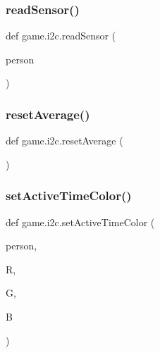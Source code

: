 \hypertarget{namespacegame_1_1i2c_aa4e92c48e15886b974e184f3f010fc1f}{}\label{namespacegame_1_1i2c_aa4e92c48e15886b974e184f3f010fc1f} 
\subsubsection{\texorpdfstring{read\+Sensor()}{readSensor()}}
{\footnotesize\ttfamily def game.\+i2c.\+read\+Sensor (\begin{DoxyParamCaption}\item[{}]{person }\end{DoxyParamCaption})}

\hypertarget{namespacegame_1_1i2c_a7e8169f802337f7cea2d2f1bd574d10b}{}\label{namespacegame_1_1i2c_a7e8169f802337f7cea2d2f1bd574d10b} 
\subsubsection{\texorpdfstring{reset\+Average()}{resetAverage()}}
{\footnotesize\ttfamily def game.\+i2c.\+reset\+Average (\begin{DoxyParamCaption}{ }\end{DoxyParamCaption})}

\hypertarget{namespacegame_1_1i2c_a6c70916a0df4071830627cc65b734df4}{}\label{namespacegame_1_1i2c_a6c70916a0df4071830627cc65b734df4} 
\subsubsection{\texorpdfstring{set\+Active\+Time\+Color()}{setActiveTimeColor()}}
{\footnotesize\ttfamily def game.\+i2c.\+set\+Active\+Time\+Color (\begin{DoxyParamCaption}\item[{}]{person,  }\item[{}]{R,  }\item[{}]{G,  }\item[{}]{B }\end{DoxyParamCaption})}

\hypertarget{namespacegame_1_1i2c_a6cc044fcf10970e62f6e7d8a8eea7dbd}{}\label{namespacegame_1_1i2c_a6cc044fcf10970e62f6e7d8a8eea7dbd} 
